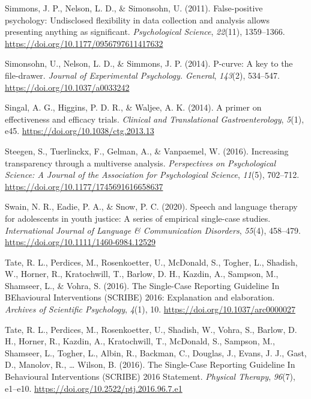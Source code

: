 \documentclass{krantz}
\newlength{\cslhangindent}
\newlength{\cslentryspacingunit} %
\newenvironment{CSLReferences}[2] %
{%
\setlength{\parindent}{0pt}
\ifodd #1
\let\oldpar\par
\def\par{\hangindent=\cslhangindent\oldpar}
\fi
\setlength{\parskip}{#2\cslentryspacingunit}
}%
{}
\begin{document}
\begin{CSLReferences}{1}{0}
\leavevmode{}%
Simmons, J. P., Nelson, L. D., \& Simonsohn, U. (2011). False-positive psychology: {Undisclosed} flexibility in data collection and analysis allows presenting anything as significant. \emph{Psychological Science}, \emph{22}(11), 1359--1366. \url{https://doi.org/10.1177/0956797611417632}

\leavevmode{}%
Simonsohn, U., Nelson, L. D., \& Simmons, J. P. (2014). P-curve: A key to the file-drawer. \emph{Journal of Experimental Psychology. General}, \emph{143}(2), 534--547. \url{https://doi.org/10.1037/a0033242}

\leavevmode{}%
Singal, A. G., Higgins, P. D. R., \& Waljee, A. K. (2014). A primer on effectiveness and efficacy trials. \emph{Clinical and Translational Gastroenterology}, \emph{5}(1), e45. \url{https://doi.org/10.1038/ctg.2013.13}

\leavevmode{}%
Steegen, S., Tuerlinckx, F., Gelman, A., \& Vanpaemel, W. (2016). Increasing transparency through a multiverse analysis. \emph{Perspectives on Psychological Science: A Journal of the Association for Psychological Science}, \emph{11}(5), 702--712. \url{https://doi.org/10.1177/1745691616658637}

\leavevmode{}%
Swain, N. R., Eadie, P. A., \& Snow, P. C. (2020). Speech and language therapy for adolescents in youth justice: {A} series of empirical single-case studies. \emph{International Journal of Language \& Communication Disorders}, \emph{55}(4), 458--479. \url{https://doi.org/10.1111/1460-6984.12529}

\leavevmode{}%
Tate, R. L., Perdices, M., Rosenkoetter, U., McDonald, S., Togher, L., Shadish, W., Horner, R., Kratochwill, T., Barlow, D. H., Kazdin, A., Sampson, M., Shamseer, L., \& Vohra, S. (2016). The {Single-Case Reporting Guideline In BEhavioural Interventions} ({SCRIBE}) 2016: {Explanation} and elaboration. \emph{Archives of Scientific Psychology}, \emph{4}(1), 10. \url{https://doi.org/10.1037/arc0000027}

\leavevmode{}%
Tate, R. L., Perdices, M., Rosenkoetter, U., Shadish, W., Vohra, S., Barlow, D. H., Horner, R., Kazdin, A., Kratochwill, T., McDonald, S., Sampson, M., Shamseer, L., Togher, L., Albin, R., Backman, C., Douglas, J., Evans, J. J., Gast, D., Manolov, R., \ldots{} Wilson, B. (2016). The {Single}-{Case} {Reporting} {Guideline} {In} {Be}havioural {Interventions} ({SCRIBE}) 2016 {Statement}. \emph{Physical Therapy}, \emph{96}(7), e1--e10. \url{https://doi.org/10.2522/ptj.2016.96.7.e1}


\end{CSLReferences}
\end{document}
